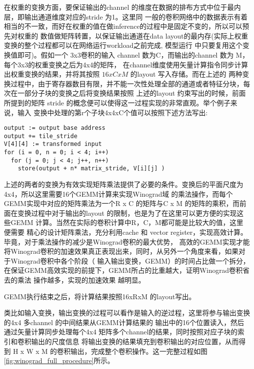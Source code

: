 在权重的变换方面，要保证输出的channel 的维度在数据的排布方式中位于最内层，即输出通道维度对应的stride 为1。这里同
一般的卷积网络中的数据表示有着相当的不一致，而好在权重的值在做inference的过程中是固定不变的，所以可以预先对权重的
数值做矩阵转置，以保证输出通道在data layout的最内存(实际上权重变换的整个过程都可以在网络运行workload之前完成, 模型运行
中只要复用这个变换值即可)。假如一个 3x3卷积的输入 channel 数为C，而输出的channel 数为 M，每个3x3的权重变换之后为4x4的矩阵，
在channel维度使用矢量计算指令同步计算出权重变换的结果，并将其按照 $ 16 x C x M $ 的layout 写入存储。而在上述的
两种变换过程中，由于寄存器数目有限，并不能一次性处理全部的通道或者特征分块，每次在一部分子块的变换之后将变换结果按照
上述的layout 约束写出的时候，前面所提到的矩阵 stride 的概念便可以使得这一过程实现的非常直观。举个例子来说，输入
变换中处理的第r个子块4x4xC个值可以按照下述方法写出:

\begin{lstlisting}[caption={输入变换的Channel维度并行计算},label={prog:store}]
output := output base address
output += tile_stride
V[4][4] := transformed input
for (i = 0, n = 0; i < 4; i++)
  for (j = 0; j < 4; j++, n++)
    store(output + n* matrix_stride, V[i][j] )
\end{lstlisting}

上述的两者的变换为有效实现矩阵乘法提供了必要的条件。变换后的平面尺度为4x4，所以这里需要16个GEMM计算来实现Winograd域
的乘法操作，而每个GEMM实现中对应的矩阵乘法为一个R x C 的矩阵与C x M 的矩阵的乘积，而前面在变换过程中对于输出的layout
的限制，也是为了在这里可以更方便的实现这些GEMM 计算。当然在实际的卷积计算中R，C，M都可能是比较大的值，这里便需要
精心的设计矩阵乘法，充分利用cache 和 vector register，实现高效计算。毕竟，对于乘法操作的减少是Winograd卷积的最大优势，
高效的GEMM实现才能将Winograd卷积的加速效果真正表现出来，同时，从另外一个角度来看，如果对于Winograd卷积中各个阶段（
输入输出变换，GEMM）的时间占比做一个拆分，在保证GEMM高效实现的前提下，GEMM所占的比重越大，证明Winograd卷积省去的乘法
操作越多，实现的加速效果 越明显。

GEMM执行结束之后，将计算结果按照16xRxM 的layout写出。

类比如输入变换，输出变换的过程可以看作是输入的逆过程，这里将参与输出变换的4x4 多channel 的中间结果从GEMM计算结果的
输出中的16个位置读入，然后通过矢量计算同步处理每个4x4 矩阵多个channel的结果，同时按照对应子块的索引和卷积输出的尺度信息
将输出变换的结果填充到卷积输出的对应位置，从而得到 H x W x M 的卷积输出，完成整个卷积操作。这一完整过程如图\ref{fig:winograd_full_procedure}所示。

